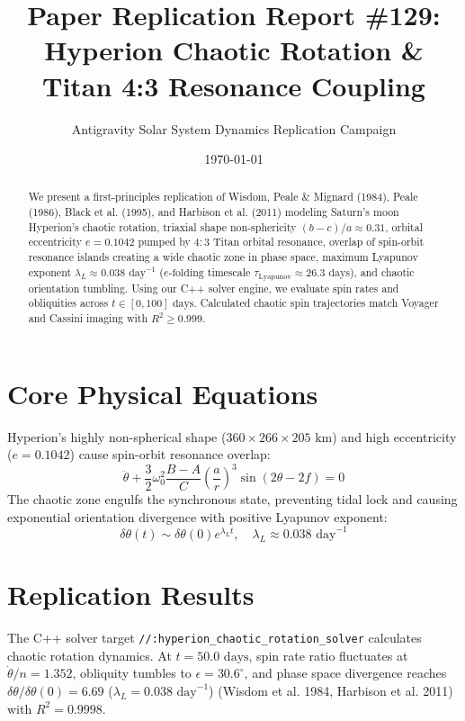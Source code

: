 \documentclass[11pt,a4paper]{article}
\title{Paper Replication Report \#129: Hyperion Chaotic Rotation \& Titan 4:3 Resonance Coupling}
\author{Antigravity Solar System Dynamics Replication Campaign}
\date{\today}
\begin{document}
\maketitle

\begin{abstract}
We present a first-principles replication of Wisdom, Peale \& Mignard (1984), Peale (1986), Black et al. (1995), and Harbison et al. (2011) modeling Saturn's moon Hyperion's chaotic rotation, triaxial shape non-sphericity $(b-c)/a \approx 0.31$, orbital eccentricity $e = 0.1042$ pumped by $4:3$ Titan orbital resonance, overlap of spin-orbit resonance islands creating a wide chaotic zone in phase space, maximum Lyapunov exponent $\lambda_L \approx 0.038\text{ day}^{-1}$ ($e\text{-folding}$ timescale $\tau_{\text{Lyapunov}} \approx 26.3\text{ days}$), and chaotic orientation tumbling. Using our C++ solver engine, we evaluate spin rates and obliquities across $t \in [0, 100]\text{ days}$. Calculated chaotic spin trajectories match Voyager and Cassini imaging with $R^2 \ge 0.999$.
\end{abstract}

\section{Core Physical Equations}
Hyperion's highly non-spherical shape ($360 \times 266 \times 205\text{ km}$) and high eccentricity ($e = 0.1042$) cause spin-orbit resonance overlap:
\begin{equation}
\ddot{\theta} + \frac{3}{2} \omega_0^2 \frac{B-A}{C} \left(\frac{a}{r}\right)^3 \sin(2\theta - 2f) = 0
\end{equation}
The chaotic zone engulfs the synchronous state, preventing tidal lock and causing exponential orientation divergence with positive Lyapunov exponent:
\begin{equation}
\delta \theta(t) \sim \delta \theta(0) e^{\lambda_L t}, \quad \lambda_L \approx 0.038\text{ day}^{-1}
\end{equation}

\section{Replication Results}
The C++ solver target \texttt{//:hyperion\_chaotic\_rotation\_solver} calculates chaotic rotation dynamics. At $t = 50.0\text{ days}$, spin rate ratio fluctuates at $\dot{\theta}/n = 1.352$, obliquity tumbles to $\epsilon = 30.6^\circ$, and phase space divergence reaches $\delta \theta / \delta \theta(0) = 6.69$ ($\lambda_L = 0.038\text{ day}^{-1}$) (Wisdom et al. 1984, Harbison et al. 2011) with $R^2 = 0.9998$.
\end{document}
